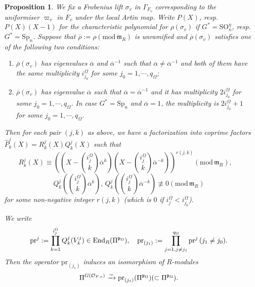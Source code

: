 \documentclass[12pt,oneside,reqno]{amsart}
\theoremstyle{plain}
\newtheorem{proposition}[theorem]{Proposition}
\begin{document}
\begin{proposition}
		
		
		
		We fix a Frobenius lift $\sigma_v$ in $\Gamma_{F_v}$ corresponding to the uniformiser $\varpi_v$ in $F_v$ under the local Artin map. Write
		$P(X)$, resp. $P(X)(X-1)$ for the characteristic polynomial for	$\rho(\sigma_v)$ if $G^\ast=\mathrm{SO}_n^\eta$, resp. $G^\ast=\mathrm{Sp}_n$. Suppose that	$\overline{\rho}:=\rho(\mathrm{mod}\,\mathfrak{m}_R)$ is unramified
		and $\overline{\rho}(\sigma_v)$ satisfies one of the following two conditions:
		\begin{enumerate}
			\item 
			$\overline{\rho}(\sigma_v)$ has eigenvalues $\overline{\alpha}$ and $\overline{\alpha}^{-1}$ such that $\overline{\alpha}\ne\overline{\alpha}^{-1}$ and both of them have the same multiplicity $i_{j_0}^\Omega$ for some	$j_0=1,\cdots,q_\Omega$;
			
			
			\item 
			$\overline{\rho}(\sigma_v)$ has eigenvalue $\overline{\alpha}$ such that
			$\overline{\alpha}=\overline{\alpha}^{-1}$ and it has multiplicity	$2i_{j_0}^\Omega$ for some $j_0=1,\cdots,q_\Omega$. In case $G^\ast=\mathrm{Sp}_n$ and $\overline{\alpha}=1$, the multiplicity is $2i^\Omega_{j_0}+1$ for some $j_0=1,\cdots,q_\Omega$.
		\end{enumerate}		
		Then for each pair $(j,k)$ as above, we have a factorization into coprime factors $\widehat{P}^j_k(X)=R_k^j(X)Q_k^j(X)$ such that
		\[
		R_k^j(X)
		\equiv
		\left(
		\left(
		X-\binom{i_j^\Omega}{k}\overline{\alpha}^k
		\right)
		\left(
		X-\binom{i_j^\Omega}{k}\overline{\alpha}^{-k}
		\right)
		\right)^{r(j,k)}
		(\mathrm{mod}\,\mathfrak{m}_R),
		\quad
		\]
		\[
		Q_k^j
		\left(
		\binom{i_j^\Omega}{k}
		\overline{\alpha}^k
		\right),
		\,
		Q_k^j
		\left(
		\binom{i_j^\Omega}{k}
		\overline{\alpha}^{-k}
		\right)
		\not\equiv
		0
		(\mathrm{mod}\,\mathfrak{m}_R)
		\]
		for some non-negative integer $r(j,k)$
		(which is $0$ if $i^\Omega_j<i^\Omega_{j_0}$).
		
		
		
		
		
		We write
		\[
		\mathrm{pr}^j
		:=
		\prod_{k=1}^{i_j^\Omega}
		Q_k^j(V_k^j)
		\in
		\mathrm{End}_R(\Pi^{\mathfrak{p}_\Omega}),\index{p@$\mathrm{pr}^j$}
		\quad
		\mathrm{pr}_{(j_1)}:=
		\prod_{j=1,j\ne j_1}^{q_\Omega}
		\mathrm{pr}^j
		\,
		(j_1\ne j_0).\index{p@$\mathrm{pr}_{(j_1)}$}
		\]
		Then
		the operator
		$\mathrm{pr}_{(j_1)}$
		induces an isomorphism
		of $R$-modules
		\begin{equation}\label{G(O_v)-invariant isomorphic to pr_{(j_1)}}
			\Pi^{ G(\mathcal{O}_{F,v})}
			\xrightarrow{\sim}
			\mathrm{pr}_{(j_1)}(\Pi^{\mathfrak{p}_\Omega})
			(\subset
			\Pi^{\mathfrak{p}_\Omega}).
		\end{equation}
	\end{proposition}
\end{document}
